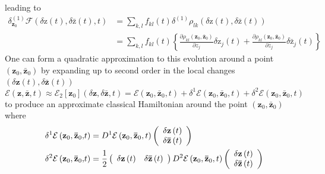 \documentclass[aps,preprint]{revtex4}%
\begin{document}
leading to
\begin{align}
\delta_{\mathbf{z}_{0}}^{\left(  1\right)  }\mathcal{F}\left(  \delta
\mathrm{z}\left(  t\right)  ,\delta\mathrm{\bar{z}}\left(  t\right)
\mathbf{,}t\right)   &  =\sum_{k,l}f_{kl}\left(  t\right)  \delta^{\left(
1\right)  }\rho_{lk}\left(  \delta\mathrm{z}\left(  t\right)  ,\delta
\mathrm{\bar{z}}\left(  t\right)  \right)  \nonumber\\
&  =\sum_{k,l}f_{kl}\left(  t\right)  \left\{  \frac{\partial\mathcal{\rho
}_{kl}\left(  \mathbf{z}_{0},\mathbf{\bar{z}}_{0}\right)  }{\partial z_{j}%
}\delta\mathrm{z}_{j}\left(  t\right)  +\frac{\partial\mathcal{\rho}%
_{kl}\left(  \mathbf{z}_{0},\mathbf{\bar{z}}_{0}\right)  }{\partial\bar{z}%
_{j}}\delta\mathrm{\bar{z}}_{j}\left(  t\right)  \right\}
\end{align}
One can form a quadratic approximation to this evolution around a point
$\left(  \mathbf{z}_{0},\mathbf{\bar{z}}_{0}\right)  $ by expanding up to
second order in the local changes $\left(  \delta\mathbf{z}\left(  t\right)
,\delta\mathbf{\bar{z}}\left(  t\right)  \right)  $
\begin{equation}
\mathcal{E}\left(  \mathbf{z},\mathbf{\bar{z},}t\right)  \approx
\mathcal{E}_{2}\left[  \mathbf{z}_{0}\right]  \left(  \delta\mathbf{z}%
,\delta\mathbf{\bar{z}},t\right)  =\mathcal{E}\left(  \mathbf{z}%
_{0},\mathbf{\bar{z}}_{0}\mathbf{,}t\right)  +\delta^{1}\mathcal{E}\left(
\mathbf{z}_{0},\mathbf{\bar{z}}_{0}\mathbf{,}t\right)  +\delta^{2}%
\mathcal{E}\left(  \mathbf{z}_{0},\mathbf{\bar{z}}_{0}\mathbf{,}t\right)
\end{equation}
to produce an approximate classical Hamiltonian around the point $\left(
\mathbf{z}_{0},\mathbf{\bar{z}}_{0}\right)  $ where
\begin{align}
\delta^{1}\mathcal{E}\left(  \mathbf{z}_{0},\mathbf{\bar{z}}_{0}%
\mathbf{,}t\right)   &  =D^{1}\mathcal{E}\left(  \mathbf{z}_{0},\mathbf{\bar
{z}}_{0},t\right)  \left(
\begin{array}
[c]{c}%
\delta\mathbf{z}\left(  t\right)  \\
\delta\mathbf{\bar{z}}\left(  t\right)
\end{array}
\right)  \\
\delta^{2}\mathcal{E}\left(  \mathbf{z}_{0},\mathbf{\bar{z}}_{0}%
\mathbf{,}t\right)   &  =\frac{1}{2}\left(
\begin{array}
[c]{cc}%
\delta\mathbf{z}\left(  t\right)   & \delta\mathbf{\bar{z}}\left(  t\right)
\end{array}
\right)  D^{2}\mathcal{E}\left(  \mathbf{z}_{0},\mathbf{\bar{z}}_{0},t\right)
\left(
\begin{array}
[c]{c}%
\delta\mathbf{z}\left(  t\right)  \\
\delta\mathbf{\bar{z}}\left(  t\right)
\end{array}
\right)
\end{align}
\end{document}
